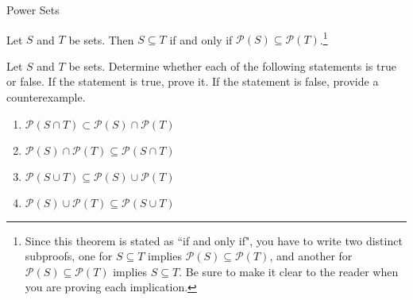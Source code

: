\begin{section}{Power Sets}
\begin{theorem}
Let $S$ and $T$ be sets.  Then $S\subseteq T$ if and only if $\mathcal{P}(S)\subseteq \mathcal{P}(T)$.\footnote{Since this theorem is stated as ``if and only if", you have to write two distinct subproofs, one for $S\subseteq T$ implies $\mathcal{P}(S)\subseteq \mathcal{P}(T)$, and another for $\mathcal{P}(S)\subseteq \mathcal{P}(T)$ implies $S\subseteq T$. Be sure to make it clear to the reader when you are proving each implication.}
\end{theorem}

\begin{problem}
Let $S$ and $T$ be sets. Determine whether each of the following statements is true or false. If the statement is true, prove it. If the statement is false, provide a counterexample.
\begin{enumerate}[label=\textrm{(\alph*)}]
\item $\mathcal{P}(S\cap T) \subset \mathcal{P}(S)\cap\mathcal{P}(T)$
\item $\mathcal{P}(S)\cap\mathcal{P}(T)\subseteq \mathcal{P}(S\cap T)$
\item $\mathcal{P}(S\cup T)\subseteq \mathcal{P}(S)\cup\mathcal{P}(T)$
\item $\mathcal{P}(S)\cup\mathcal{P}(T)\subseteq \mathcal{P}(S\cup T)$
\end{enumerate}
\end{problem}

%
%

\end{section}